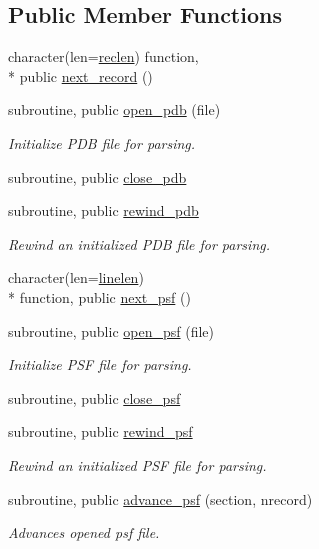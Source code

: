 \subsection*{Public Member Functions}
\begin{DoxyCompactItemize}
\item 
character(len=\hyperlink{classmolreader_a8f12be3272b946fd698c9fbaf2ba9d32}{reclen}) function, \\*
public \hyperlink{classmolreader_af6c857ef51f99971a66b1c293d24906b}{next\-\_\-record} ()
\item 
subroutine, public \hyperlink{classmolreader_a38a3903d901bc5e0b318bcc0dfd1b3ff}{open\-\_\-pdb} (file)
\begin{DoxyCompactList}\small\item\em Initialize P\-D\-B file for parsing. \end{DoxyCompactList}\item 
subroutine, public \hyperlink{classmolreader_a5aafbdb9b4afbb96bdc20ae58d547699}{close\-\_\-pdb}
\item 
subroutine, public \hyperlink{classmolreader_af85c66302e278af03e0cc94dc42e662e}{rewind\-\_\-pdb}
\begin{DoxyCompactList}\small\item\em Rewind an initialized P\-D\-B file for parsing. \end{DoxyCompactList}\item 
character(len=\hyperlink{classmolreader_acd493d996a1fcd0ed77937e925c9b7fe}{linelen}) \\*
function, public \hyperlink{classmolreader_ac6b85a406b7ebd0810f0d63beeeda783}{next\-\_\-psf} ()
\item 
subroutine, public \hyperlink{classmolreader_a3ebd81391f00e3279bf262b2879af97a}{open\-\_\-psf} (file)
\begin{DoxyCompactList}\small\item\em Initialize P\-S\-F file for parsing. \end{DoxyCompactList}\item 
subroutine, public \hyperlink{classmolreader_aac446b95d6c274d93e11e45286e60e4d}{close\-\_\-psf}
\item 
subroutine, public \hyperlink{classmolreader_a6d79c8d97fd91cfb25dec2b67320c77b}{rewind\-\_\-psf}
\begin{DoxyCompactList}\small\item\em Rewind an initialized P\-S\-F file for parsing. \end{DoxyCompactList}\item 
subroutine, public \hyperlink{classmolreader_a7a4cb6436916cd4b8ee0341d528e9c73}{advance\-\_\-psf} (section, nrecord)
\begin{DoxyCompactList}\small\item\em Advances opened psf file. \end{DoxyCompactList}\end{DoxyCompactItemize}
